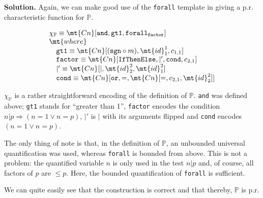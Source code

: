 \begin{itemize}
	\textbf{Solution.} Again, we can make good use of the \texttt{forall} template in giving a p.r. characteristic function for $\mathbb{P}$.
	
	$$
		\begin{array}{l}
			\chi_{\mathbb{P}} \equiv \mt{Cn}[\texttt{and}, \texttt{gt1}, \texttt{forall}_{\texttt{factor}}]\\
			\mt{where}\\
			\quad \texttt{gt1} \equiv \mt{Cn}[(\texttt{sgn} \circ m), \mt{id}^1_1, c_{1,1}]\\
			\quad \texttt{factor} \equiv \mt{Cn}[\texttt{IfThenElse}, |', \texttt{cond}, c_{2,1}]\\
			\quad |' \equiv \mt{Cn}[|, \mt{id}^2_2, \mt{id}^2_1]\\
			\quad \texttt{cond} \equiv \mt{Cn}[\texttt{or}, =, \mt{Cn}[=, c_{2,1}, \mt{id}^2_2]]
		\end{array}
	$$
	
	$\chi_\mathbb{P}$ is a rather straightforward encoding of the definition of $\mathbb{P}$. \texttt{and} was defined above; \texttt{gt1} stands for ``greater than 1'', \texttt{factor} encodes the condition $n | p \Rightarrow (n = 1 \vee n = p)$, $|'$ is $|$ with its arguments flipped and \texttt{cond} encodes $(n = 1 \vee n = p)$.
	
	The only thing of note is that, in the definition of $\mathbb{P}$, an unbounded universal quantification was used, whereas \texttt{forall} is bounded from above. This is not a problem: the quantified variable $n$ is only used in the test $n | p$ and, of course, all factors of $p$ are $\leq p$. Here, the bounded quantification of \texttt{forall} is sufficient.
	
	We can quite easily see that the construction is correct and that thereby, $\mathbb{P}$ is p.r.
\end{itemize}

